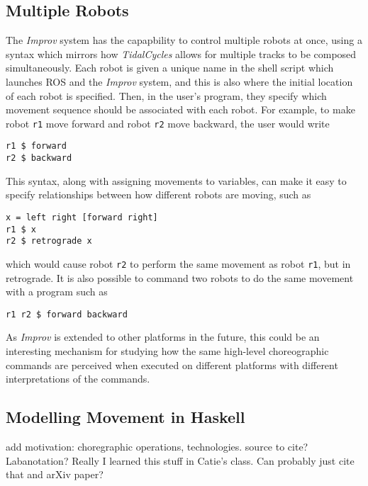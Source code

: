 \documentclass[sigconf]{acmart}
\begin{document}
\subsection{Multiple Robots}\label{multiple-robots}

The \emph{Improv} system has the capapbility to control multiple robots
at once, using a syntax which mirrors how \emph{TidalCycles} allows for
multiple tracks to be composed simultaneously. Each robot is given a
unique name in the shell script which launches ROS and the \emph{Improv}
system, and this is also where the initial location of each robot is
specified. Then, in the user's program, they specify which movement
sequence should be associated with each robot. For example, to make
robot \texttt{r1} move forward and robot \texttt{r2} move backward, the
user would write

\begin{verbatim}
r1 $ forward
r2 $ backward
\end{verbatim}

This syntax, along with assigning movements to variables, can make it easy to
specify relationships between how different robots are moving, such as

\begin{verbatim}
x = left right [forward right]
r1 $ x
r2 $ retrograde x
\end{verbatim}


which would cause robot \texttt{r2} to perform the same movement as
robot \texttt{r1}, but in retrograde. It is also possible to command two robots
to do the same movement with a program such as

\begin{verbatim}
r1 r2 $ forward backward
\end{verbatim}

As \emph{Improv} is extended to other platforms in the future, this could be an
interesting mechanism for studying how the same high-level choreographic
commands are perceived when executed on different platforms with different
interpretations of the commands.

\subsection{Modelling Movement in
Haskell}\label{modelling-movement-in-haskell}

{\color{red}add motivation: choregraphic operations, technologies. source to
cite? Labanotation? Really I learned this stuff in Catie's class. Can probably
just cite that and arXiv paper?}
\end{document}
